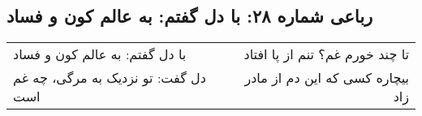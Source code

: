 \begin{center}
\section*{رباعی شماره ۲۸: با دل گفتم: به عالم کون و فساد}
\label{sec:028}
\begin{longtable}{l p{0.5cm} r}
با دل گفتم: به عالم کون و فساد
&&
تا چند خورم غم؟ تنم از پا افتاد
\\
دل گفت: تو نزدیک به مرگی، چه غم است
&&
بیچاره کسی که این دم از مادر زاد
\\
\end{longtable}
\end{center}
